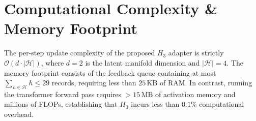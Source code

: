 \documentclass[10pt,journal,compsoc]{IEEEtran}
\begin{document}
\section{Computational Complexity & Memory Footprint}
The per-step update complexity of the proposed $H_3$ adapter is strictly $\mathcal{O}(d \cdot |\mathcal{H}|)$, where $d=2$ is the latent manifold dimension and $|\mathcal{H}|=4$. The memory footprint consists of the feedback queue containing at most $\sum_{h \in \mathcal{H}} h \le 29$ records, requiring less than $25\,\text{KB}$ of RAM. In contrast, running the transformer forward pass requires $> 15\,\text{MB}$ of activation memory and millions of FLOPs, establishing that $H_3$ incurs less than $0.1\%$ computational overhead.

\end{document}
